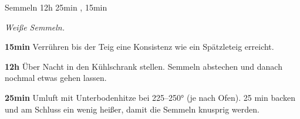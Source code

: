 \documentclass[../recipe-collections/cooking.tex]{subfiles}
\begin{document}
\begin{recipe}{Semmeln} {} {12h 25min , 15min }

  \freeform{}\textit{Weiße Semmeln.}


  \textbf{15min}
  Verrühren bis der Teig eine Konsistenz wie ein Spätzleteig erreicht.

  \newstep{}\textbf{12h}
  Über Nacht in den Kühlschrank stellen.
  Semmeln abstechen und danach nochmal etwas gehen lassen.

  \newstep{}\textbf{25min}
  Umluft mit Unterbodenhitze bei 225–250° (je nach Ofen).
  25 min backen und am Schluss ein wenig heißer, damit die Semmeln knusprig werden.

  \freeform{}\hrulefill{}

\end{recipe}
\end{document}
